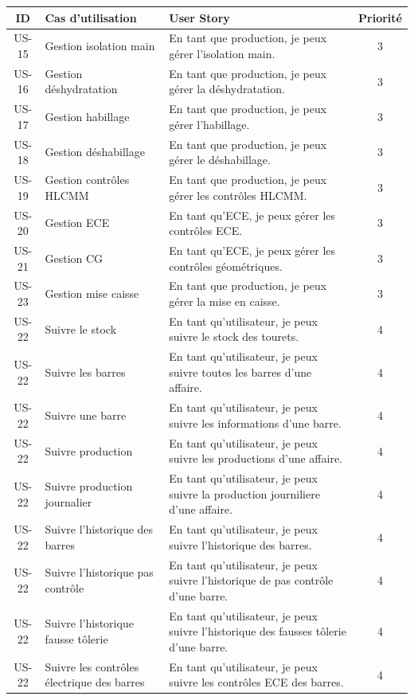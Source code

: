 \documentclass[11pt,a4paper]{article}
\begin{document}
\newpage
\begin{table}[H]
\centering
\begin{tabular}{|c|p{5cm}|p{7cm}|c|}
\hline
\textbf{ID} & \textbf{Cas d’utilisation} & \textbf{User Story} & \textbf{Priorité} \\
\hline
US-15 & Gestion isolation main & En tant que production, je peux gérer l’isolation main. & 3 \\
\hline
US-16 & Gestion déshydratation & En tant que production, je peux gérer la déshydratation. & 3 \\
\hline
US-17 & Gestion habillage & En tant que production, je peux gérer l’habillage. & 3 \\
\hline
US-18 & Gestion déshabillage & En tant que production, je peux gérer le déshabillage. & 3 \\
\hline
US-19 & Gestion contrôles HLCMM & En tant que production, je peux gérer les contrôles HLCMM. & 3 \\
\hline
US-20 & Gestion ECE & En tant qu’ECE, je peux gérer les contrôles ECE. & 3 \\
\hline
US-21 & Gestion CG & En tant qu’ECE, je peux gérer les contrôles géométriques. & 3 \\
\hline
US-23 & Gestion mise caisse & En tant que production, je peux gérer la mise en caisse. & 3 \\
\hline
US-22 & Suivre le stock & En tant qu’utilisateur, je peux suivre le stock des tourets. & 4 \\
\hline
US-22 & Suivre les barres & En tant qu’utilisateur, je peux suivre toutes les barres d'une affaire. & 4 \\
\hline
US-22 & Suivre une barre  & En tant qu’utilisateur, je peux suivre les informations d'une barre. & 4 \\
\hline
US-22 & Suivre production & En tant qu’utilisateur, je peux suivre les productions d'une affaire. & 4 \\
\hline
US-22 & Suivre production journalier & En tant qu’utilisateur, je peux suivre la production journiliere d'une affaire. & 4 \\
\hline
US-22 & Suivre l'historique des barres & En tant qu’utilisateur, je peux suivre l'historique des barres. & 4 \\
\hline
US-22 & Suivre l'historique pas contrôle & En tant qu’utilisateur, je peux suivre l'historique de pas contrôle d'une barre. & 4 \\
\hline
US-22 & Suivre l'historique fausse tôlerie & En tant qu’utilisateur, je peux suivre l'historique des fausses tôlerie d'une barre. & 4 \\
\hline
US-22 & Suivre les contrôles électrique des barres & En tant qu’utilisateur, je peux suivre les contrôles ECE des barres. & 4 \\


\end{tabular}
\end{table}
\end{document}
